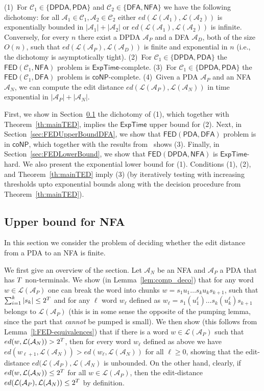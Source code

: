 \documentclass{CSML}
\newcommand{\aut}{\mathcal{A}}
\newcommand{\EXPTIME}{\textsf{ExpTime}}
\newcommand{\coNP}{\textsf{coNP}}
\newcommand{\class}{\mathcal{C}}
\newcommand{\DFA}{\mathsf{DFA}}
\newcommand{\NFA}{\mathsf{NFA}}
\newcommand{\PDA}{\mathsf{PDA}}
\newcommand{\DPDA}{\mathsf{DPDA}}
\newcommand{\FED}{\mathsf{FED}}
\newcommand{\lang}{\mathcal{L}}
\newcommand{\ed}{ed}
\begin{document}
\begin{thm}
(1)~For $\class_1 \in \{\DPDA,\PDA\}$ and $\class_2 \in \{\DFA,\NFA\}$ we have the following dichotomy:
for all $\aut_1 \in \class_1, \aut_2 \in \class_2$ either $\ed(\lang(\aut_1),\lang(\aut_2))$  is 
exponentially bounded in $|\aut_1| + |\aut_2|$ or $\ed(\lang(\aut_1),\lang(\aut_2))$ is infinite.
Conversely, for every $n$ there exist a DPDA $\aut_P$ and a DFA $\aut_D$, both of the size $O(n)$, such that 
$\ed(\lang(\aut_P),\lang(\aut_D))$ is finite and exponential in $n$ (i.e.,
the dichotomy is asymptotically tight).
(2)~For $\class_1 \in \{\DPDA,\PDA\}$ the $\FED(\class_1, \NFA)$ problem is $\EXPTIME$-complete.
(3)~For $\class_1 \in \{\DPDA,\PDA\}$ the $\FED(\class_1, \DFA)$ problem is $\coNP$-complete.
(4)~Given a PDA $\aut_P$ and an NFA $\aut_N$, we can compute the edit distance 
$\ed(\lang(\aut_P),\lang(\aut_N))$ in time exponential in $|\aut_P| + |\aut_N|$.
\label{th:FEDmain}
\end{thm}

First, we show in Section~\ref{sec:FEDUpperBoundNFA} the dichotomy of (1), 
which together with Theorem~\ref{th:mainTED}, implies the $\EXPTIME$ upper bound for (2).
Next, in Section~\ref{sec:FEDUpperBoundDFA}, we show that $\FED(\PDA, \DFA)$ problem is in $\coNP$, which together with the results from~\cite{boundedRiveros}
shows (3). 
Finally, in Section~\ref{sec:FEDLowerBound}, we show that $\FED(\DPDA, \NFA)$ is 
$\EXPTIME$-hard.
We also present the exponential lower bound for (1).
Conditions (1), (2), and Theorem~\ref{th:mainTED} imply (3)
(by iteratively testing with increasing thresholds upto exponential bounds 
along with the decision procedure from Theorem~\ref{th:mainTED}).

\subsection{Upper bound for NFA}
\label{sec:FEDUpperBoundNFA}

In this section we consider the problem of deciding whether the edit distance from a PDA to an NFA is finite. 

We first give an overview of the section. Let $\aut_N$ be an NFA and $\aut_P$ a PDA that has $T$ non-terminals. We show (in Lemma~\ref{lem:comp_deco}) that for any word $w\in \lang({\aut_P})$ one can break the word into chunks $w=s_1 u_1 \ldots s_k u_k s_{k+1}$, such that $\sum_{i=1}^k |s_k|\leq 2^{T}$ and for any $\ell$ word $w_\ell$ defined as $w_{\ell}=s_1 (u_1^\ell) \ldots s_k (u_k^\ell) s_{k+1}$ belongs to $\lang({\aut_P})$ (this is in some sense the opposite of the pumping lemma, since the part that {\em cannot} be pumped is small). We then show (this follows from Lemma~\ref{l:FED-equivalences}) that if there is a word $w \in \lang({\aut_P})$ such that $\ed(w,\lang({\aut_N}))>2^{\nonTerm}$, then for every word $w_\ell$ defined as above we have
 $\ed(w_{\ell+1},\lang({\aut_N}))>\ed(w_\ell,\lang({\aut_N}))$ for all $\ell\geq 0$, showing that the edit-distance $\ed(\lang({\aut_P}),\lang({\aut_N})$ is unbounded. On the other hand, clearly, if $\ed(w,\lang({\aut_N}))\leq  2^{\nonTerm}$ for all $w\in \lang({\aut_P})$, then the edit-distance $\ed(\lang({\aut_P}),\lang({\aut_N}))\leq  2^{\nonTerm}$ by definition.
\end{document}
